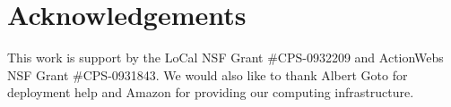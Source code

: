\section{Acknowledgements}
This work is support by the LoCal NSF Grant \#CPS-0932209 and ActionWebs NSF Grant \#CPS-0931843.  We would also like
to thank Albert Goto for deployment help and Amazon for providing our computing infrastructure.




